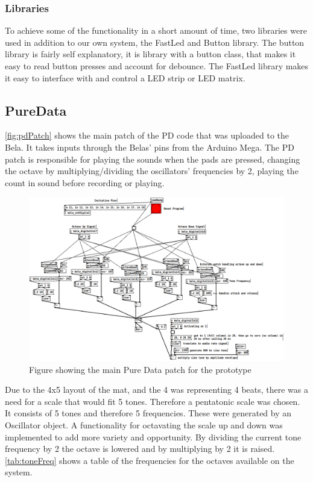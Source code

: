 		\subsubsection{Libraries}%
			To achieve some of the functionality in a short amount of time, two libraries were used in addition to our own system,
			the FastLed and Button library. The button library is fairly self explanatory, it is library with a button class, that makes it easy to read button presses and account for debounce. The FastLed library makes it easy to interface with and control a LED strip or LED matrix.
	\subsection{PureData}%
		\autoref{fig:pdPatch} shows the main patch of the PD code that was uploaded to the Bela. It takes inputs through the Belas' pins from the Arduino Mega. The PD patch is responsible for playing the sounds when the pads are pressed, changing the octave by multiplying/dividing the oscillators' frequencies by 2, playing the count in sound before recording or playing.
	
	\begin{figure}[H]
		\centering
		\includegraphics[width=1\linewidth]{figure/Implementation/pdPatch}
		\caption{Figure showing the main Pure Data patch for the prototype}
		\label{fig:pdPatch}
	\end{figure}
	\noindent
	Due to the 4x5 layout of the mat, and the 4 was representing 4 beats, there was a need for a scale that would fit 5 tones. Therefore a pentatonic scale was chosen. It consists of 5 tones and therefore 5 frequencies. These were generated by an Oscillator object. A functionality for octavating the scale up and down was implemented to add more variety and opportunity. By dividing the current tone frequency by 2 the octave is lowered and by multiplying by 2 it is raised. \autoref{tab:toneFreq} shows a table of the frequencies for the octaves available on the system.
	

